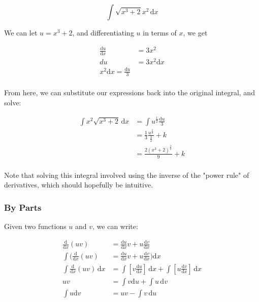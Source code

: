 \documentclass[12pt]{article}
\begin{document}
$$\int \sqrt{x^3+2}x^2 \,\text{d}x$$

We can let $u = x^3+2$, and differentiating $u$ in terms of $x$, we get

\begin{equation}
\begin{split}
    \frac{\text{d}u}{\text{d}x} &= 3x^2\\
    du &= 3x^2 \text{d}x\\
    x^2 \text{d}x = \frac{\text{d}u}{3}\\
    \end{split}
\end{equation}

From here, we can substitute our expressions back into the original integral, and solve:

\begin{equation}
    \begin{split}
    \int x^2\sqrt{x^3+2} \,\text{d}x &= \int u^\frac{1}{2} \frac{\text{d}u}{3}\\
    &= \frac{1}{3} \frac{u^{\frac{3}{2}}}{\frac{3}{2}} + k\\
    &= \frac{2(x^3+2)^{\frac{3}{2}}}{9} + k\\
    \end{split}
\end{equation}

Note that solving this integral involved using the inverse of the "power rule" of derivatives, which should hopefully be intuitive.

\subsubsection{By Parts}

Given two functions $u$ and $v$, we can write:

\begin{equation}
\begin{split}
    \frac{\text{d}}{\text{d}x}(uv) &= \frac{\text{d}u}{\text{d}x} v + u \frac{\text{d}v}{\text{d}x}\\
    \int (\frac{\text{d}}{\text{d}x}(uv) &= \frac{\text{d}u}{\text{d}x} v + u \frac{\text{d}v}{\text{d}x})\text{d}x\\
    \int \frac{\text{d}}{\text{d}x} (uv) \,\text{d}x &= \int \left[v \frac{\text{d}u}{\text{d}x}\right] \,\text{d}x + \int \left[u \frac{\text{d}v}{\text{d}x}\right] \,\text{d}x\\
    uv &= \int v \text{d}u + \int u \,\text{d}v\\
    \int u \text{d}v &= uv - \int v \,\text{d}u\\
\end{split}
\end{equation}
\end{document}
